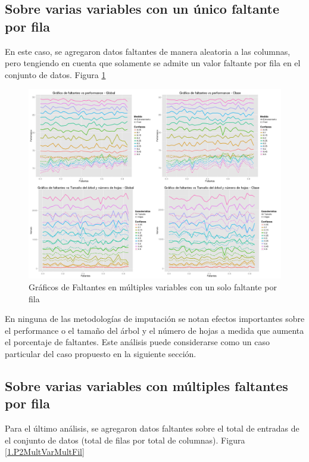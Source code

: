 \documentclass[]{article}
\begin{document}
\subsection{Sobre varias variables con un único faltante por fila}
En este caso, se agregaron datos faltantes de manera aleatoria a las columnas, pero tengiendo en cuenta que solamente se admite un valor faltante por fila en el conjunto de datos. Figura \ref{2.P2MultVarUnicFil} 

\begin{figure}[H]
	\includegraphics[scale = 0.27]{2_1_Mult_Col_Unic_Fil}
	\caption[Faltantes Múltiple variable]{Gráficos de Faltantes en múltiples variables con un solo faltante por fila}
	\label{2.P2MultVarUnicFil}
\end{figure}

En ninguna de las metodologías de imputación se notan efectos importantes sobre el performance o el tamaño del árbol y el número de hojas a medida que aumenta el porcentaje de faltantes. Este análisis puede considerarse como un caso particular del caso propuesto en la siguiente sección.

\subsection{Sobre varias variables con múltiples faltantes por fila}
Para el último análisis, se agregaron datos faltantes sobre el total de entradas de el conjunto de datos (total de filas por total de columnas). Figura \ref{1.P2MultVarMultFil}
\end{document}
